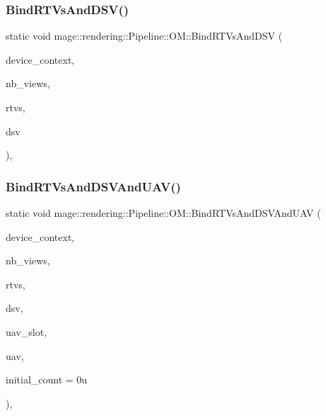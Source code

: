 \subsubsection{\texorpdfstring{Bind\+R\+T\+Vs\+And\+D\+S\+V()}{BindRTVsAndDSV()}}
{\footnotesize\ttfamily static void mage\+::rendering\+::\+Pipeline\+::\+O\+M\+::\+Bind\+R\+T\+Vs\+And\+D\+SV (\begin{DoxyParamCaption}\item[{I\+D3\+D11\+Device\+Context \&}]{device\+\_\+context,  }\item[{\mbox{\hyperlink{namespacemage_aa5d6eaabaac3cdd01873d6a3d27e90f3}{U32}}}]{nb\+\_\+views,  }\item[{I\+D3\+D11\+Render\+Target\+View $\ast$const $\ast$}]{rtvs,  }\item[{I\+D3\+D11\+Depth\+Stencil\+View $\ast$}]{dsv }\end{DoxyParamCaption})\hspace{0.3cm}{\ttfamily [static]}, {\ttfamily [noexcept]}}

\mbox{\label{structmage_1_1rendering_1_1_pipeline_1_1_o_m_ad1f9cf7c290cb8f2135a21f5d4f25473}} 
\subsubsection{\texorpdfstring{Bind\+R\+T\+Vs\+And\+D\+S\+V\+And\+U\+A\+V()}{BindRTVsAndDSVAndUAV()}}
{\footnotesize\ttfamily static void mage\+::rendering\+::\+Pipeline\+::\+O\+M\+::\+Bind\+R\+T\+Vs\+And\+D\+S\+V\+And\+U\+AV (\begin{DoxyParamCaption}\item[{I\+D3\+D11\+Device\+Context \&}]{device\+\_\+context,  }\item[{\mbox{\hyperlink{namespacemage_aa5d6eaabaac3cdd01873d6a3d27e90f3}{U32}}}]{nb\+\_\+views,  }\item[{I\+D3\+D11\+Render\+Target\+View $\ast$const $\ast$}]{rtvs,  }\item[{I\+D3\+D11\+Depth\+Stencil\+View $\ast$}]{dsv,  }\item[{\mbox{\hyperlink{namespacemage_aa5d6eaabaac3cdd01873d6a3d27e90f3}{U32}}}]{uav\+\_\+slot,  }\item[{I\+D3\+D11\+Unordered\+Access\+View $\ast$}]{uav,  }\item[{\mbox{\hyperlink{namespacemage_aa5d6eaabaac3cdd01873d6a3d27e90f3}{U32}}}]{initial\+\_\+count = {\ttfamily 0u} }\end{DoxyParamCaption})\hspace{0.3cm}{\ttfamily [static]}, {\ttfamily [noexcept]}}

